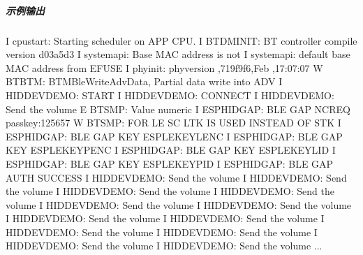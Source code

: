 \documentclass[a4paper,12pt,english]{sphinxmanual}
\begin{document}
{{\subparagraph{示例输出}
\label{\detokenize{exp-esp32/bluetooth/hid-gap:id3}}
\begin{sphinxVerbatim}[commandchars=\\\{\}]
I  cpu\PYGZus{}start: Starting scheduler on APP CPU.
I  BTDM\PYGZus{}INIT: BT controller compile version \PYG{o}{[}d03a5d3\PYG{o}{]}
I  system\PYGZus{}api: Base MAC address is not 
I  system\PYGZus{}api:  default base MAC address from EFUSE
I  phy\PYGZus{}init: phy\PYGZus{}version ,719f9f6,Feb  ,17:07:07
W  BT\PYGZus{}BTM: BTM\PYGZus{}BleWriteAdvData, Partial data write into ADV
I  HID\PYGZus{}DEV\PYGZus{}DEMO: START
I  HID\PYGZus{}DEV\PYGZus{}DEMO: CONNECT
I  HID\PYGZus{}DEV\PYGZus{}DEMO: Send the volume
E  BT\PYGZus{}SMP: Value  numeric   
I  ESP\PYGZus{}HID\PYGZus{}GAP: BLE GAP NC\PYGZus{}REQ passkey:125657
W  BT\PYGZus{}SMP: FOR LE SC LTK IS USED INSTEAD OF STK
I  ESP\PYGZus{}HID\PYGZus{}GAP: BLE GAP KEY   ESP\PYGZus{}LE\PYGZus{}KEY\PYGZus{}LENC
I  ESP\PYGZus{}HID\PYGZus{}GAP: BLE GAP KEY   ESP\PYGZus{}LE\PYGZus{}KEY\PYGZus{}PENC
I  ESP\PYGZus{}HID\PYGZus{}GAP: BLE GAP KEY   ESP\PYGZus{}LE\PYGZus{}KEY\PYGZus{}LID
I  ESP\PYGZus{}HID\PYGZus{}GAP: BLE GAP KEY   ESP\PYGZus{}LE\PYGZus{}KEY\PYGZus{}PID
I  ESP\PYGZus{}HID\PYGZus{}GAP: BLE GAP AUTH SUCCESS
I  HID\PYGZus{}DEV\PYGZus{}DEMO: Send the volume
I  HID\PYGZus{}DEV\PYGZus{}DEMO: Send the volume
I  HID\PYGZus{}DEV\PYGZus{}DEMO: Send the volume
I  HID\PYGZus{}DEV\PYGZus{}DEMO: Send the volume
I  HID\PYGZus{}DEV\PYGZus{}DEMO: Send the volume
I  HID\PYGZus{}DEV\PYGZus{}DEMO: Send the volume
I  HID\PYGZus{}DEV\PYGZus{}DEMO: Send the volume
I  HID\PYGZus{}DEV\PYGZus{}DEMO: Send the volume
I  HID\PYGZus{}DEV\PYGZus{}DEMO: Send the volume
I  HID\PYGZus{}DEV\PYGZus{}DEMO: Send the volume
I  HID\PYGZus{}DEV\PYGZus{}DEMO: Send the volume
I  HID\PYGZus{}DEV\PYGZus{}DEMO: Send the volume
...
\end{sphinxVerbatim}


}}
\end{document}
